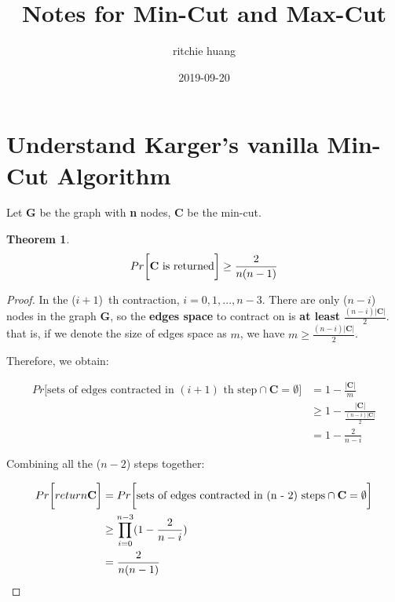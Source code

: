 \documentclass[a4paper, 12pt, titlepage]{article}
\title{Notes for Min-Cut and Max-Cut}
\author{ritchie huang}
\date{2019-09-20}
\newtheorem{theorem}{Theorem}
\newtheorem{proof}{Proof}
\begin{document}
\maketitle 

\tableofcontents
\newpage

\section{Understand Karger's vanilla Min-Cut Algorithm}
Let \textbf{G} be the graph with \textbf{n} nodes, \textbf{C} be the min-cut. 

\begin{theorem}
\[
    Pr \bigg[ \text{\textbf{C} is returned} \bigg] \geq \frac{2}{n (n - 1)}
\]
\end{theorem}

\begin{proof}

In the ($i + 1$)~th contraction, $i = 0, 1, ..., n - 3$. There are only ({$n - i$}) nodes in the graph \textbf{G}, so the \textbf{edges space} to contract on is \textbf{at least} $\frac{(n - i)|\textbf{C}|}{2}$.
that is, if we denote the size of edges space as $ m $, we have $ m \geq \frac{(n - i) |\textbf{C}|}{2} $. 

Therefore, we obtain:

\begin{equation}
    \begin{aligned}
    Pr \bigg[ \text{sets of edges contracted in $(i + 1)$~th step} \cap \textbf{C} = \emptyset \bigg] &= 1 - \frac{|\textbf{C}|}{m} \\
                                                                                                      &\geq 1 - \frac{|\textbf{C}|}{\frac{(n - i) |\textbf{C}|}{2}} \\
                                                                                                      &= 1 - \frac{2}{n -i}
    \end{aligned}
\end{equation}

Combining all the ($n - 2$) steps together:

\begin{equation}\label{product prob}
    \begin{aligned}
    Pr \bigg[ return \text{\textbf{C}} \bigg] &= Pr \bigg[ \text{sets of edges contracted in (n - 2) steps} \cap \textbf{C} = \emptyset \bigg] \\
                                                    &\geq \prod_{i = 0}^{n - 3} (1 - \frac{2}{n - i}) \\
                                                    &= \frac{2}{n ( n - 1)}
    \end{aligned}
\end{equation}

\end{proof}
\end{document}
